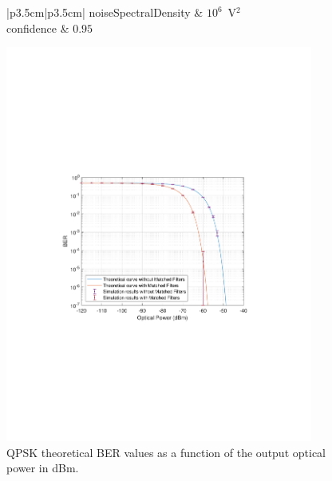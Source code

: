 \begin{figure}[H]
\begin{minipage}[b]{0.5\linewidth}
\begin{table}[H]
\begin{tabulary}{1.0\textwidth}{|p{3.5cm}|p{3.5cm}|}
			noiseSpectralDensity   & $10^6$~V$^2$                             \\ \hline
			confidence             & $0.95$                                                     \\ \hline
		\end{tabulary}
	\end{table}
\end{minipage}
\begin{minipage}[b]{0.5\linewidth}
	\centering
	\includegraphics[clip, trim=4cm 8cm 4cm 8cm, width=0.9\textwidth]{./sdf/m_qam_system/figures/teor_vs_simul.pdf}
\end{minipage}
\caption{QPSK theoretical BER values as a function of the output optical power in dBm.\label{fig:ber_pseudorandom}}
\end{figure}


